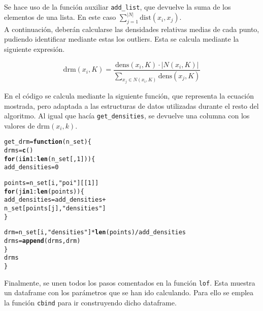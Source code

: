 \documentclass[12pt]{report}\usepackage[]{graphicx}\usepackage[dvipsnames]{xcolor}
\makeatletter
\newcommand{\hlnum}[1]{\textcolor[rgb]{0.686,0.059,0.569}{#1}}%
\newcommand{\hlstr}[1]{\textcolor[rgb]{0.192,0.494,0.8}{#1}}%
\newcommand{\hlopt}[1]{\textcolor[rgb]{0,0,0}{#1}}%
\newcommand{\hlstd}[1]{\textcolor[rgb]{0.345,0.345,0.345}{#1}}%
\newcommand{\hlkwa}[1]{\textcolor[rgb]{0.161,0.373,0.58}{\textbf{#1}}}%
\newcommand{\hlkwb}[1]{\textcolor[rgb]{0.69,0.353,0.396}{#1}}%
\newcommand{\hlkwc}[1]{\textcolor[rgb]{0.333,0.667,0.333}{#1}}%
\newcommand{\hlkwd}[1]{\textcolor[rgb]{0.737,0.353,0.396}{\textbf{#1}}}%
\newenvironment{kframe}{%
 \def\at@end@of@kframe{}%
 \ifinner\ifhmode%
  \def\at@end@of@kframe{\end{minipage}}%
  \begin{minipage}{\columnwidth}%
 \fi\fi%
 \def\FrameCommand##1{\hskip\@totalleftmargin \hskip-\fboxsep
 \colorbox{shadecolor}{##1}\hskip-\fboxsep
     \hskip-\linewidth \hskip-\@totalleftmargin \hskip\columnwidth}%
 \MakeFramed {\advance\hsize-\width
   \@totalleftmargin\z@ \linewidth\hsize
   \@setminipage}}%
 {\par\unskip\endMakeFramed%
 \at@end@of@kframe}
\newenvironment{knitrout}{}{} %
\newcommand{\dt}{\text{dist}}
\newcommand{\ds}{\text{dens}}
\newcommand{\drm}{\text{drm}}
\makeatother
\begin{document}
						Se hace uso de la función auxiliar \texttt{add\_list}, que devuelve la suma de los elementos de una lista. En este caso $\sum_{j=1}^{|N|} \dt(x_i, x_j)$. \\
						
						A continuación, deberán calcularse las densidades relativas medias de cada punto, pudiendo identificar mediante estas los outliers. Esta se calcula mediante la siguiente expresión. 
						
						$$
						\drm(x_i, K) = \frac{\ds(x_i, K) \cdot |N(x_i, K)|}{\displaystyle\sum_{x_j \in N(x_i, K)}\ds(x_j, K)}
						$$
						
						En el código se calcula mediante la siguiente función, que representa la ecuación mostrada, pero adaptada a las estructuras de datos utilizadas durante el resto del algoritmo. Al igual que hacía \texttt{get\_densities}, se devuelve una columna con los valores de $\drm(x_i, k)$. 
						
\begin{knitrout}
\color{fgcolor}\begin{kframe}
\begin{alltt}
\hlstd{get_drm} \hlkwb{=} \hlkwa{function}\hlstd{(}\hlkwc{n_set}\hlstd{) \{}
        \hlstd{drms} \hlkwb{=} \hlkwd{c}\hlstd{()}
        \hlkwa{for} \hlstd{(i} \hlkwa{in} \hlnum{1}\hlopt{:}\hlkwd{len}\hlstd{(n_set[,}\hlnum{1}\hlstd{])) \{}
                \hlstd{add_densities} \hlkwb{=} \hlnum{0}

                \hlstd{points} \hlkwb{=} \hlstd{n_set[i,} \hlstr{"poi"}\hlstd{][[}\hlnum{1}\hlstd{]]}
                \hlkwa{for} \hlstd{(j} \hlkwa{in} \hlnum{1}\hlopt{:}\hlkwd{len}\hlstd{(points)) \{}
                        \hlstd{add_densities} \hlkwb{=} \hlstd{add_densities} \hlopt{+}
                                \hlstd{n_set[points[j],} \hlstr{"densities"}\hlstd{]}
                \hlstd{\}}

                \hlstd{drm} \hlkwb{=} \hlstd{n_set[i,} \hlstr{"densities"}\hlstd{]} \hlopt{*} \hlkwd{len}\hlstd{(points)} \hlopt{/} \hlstd{add_densities}
                \hlstd{drms} \hlkwb{=} \hlkwd{append}\hlstd{(drms, drm)}
        \hlstd{\}}
        \hlstd{drms}
\hlstd{\}}
\end{alltt}
\end{kframe}
\end{knitrout}
						
						Finalmente, se unen todos los pasos comentados en la función \texttt{lof}. Esta muestra un dataframe con los parámetros que se han ido calculando. Para ello se emplea la función \texttt{cbind} para ir construyendo dicho dataframe. 
						
\end{document}
